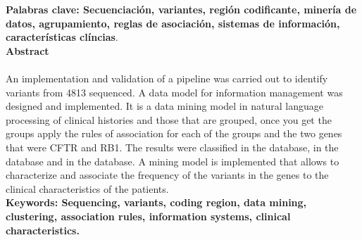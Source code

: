 \textbf{\small Palabras clave: Secuenciación, variantes, región codificante, minería de datos, agrupamiento, reglas de asociación, sistemas de información, características clíncias}.\\


\textbf{\LARGE Abstract}\\\\
An implementation and validation of a pipeline was carried out to identify variants from 4813 sequenced. A data model for information management was designed and implemented. It is a data mining model in natural language processing of clinical histories and those that are grouped, once you get the groups apply the rules of association for each of the groups and the two genes that were  CFTR and RB1. The results were classified in the database, in the database and in the database. A mining model is implemented that allows to characterize and associate the frequency of the variants in the genes to the clinical characteristics of the patients.\\[2.0cm]
\textbf{\small Keywords: Sequencing, variants, coding region, data mining, clustering, association rules, information systems, clinical characteristics.}\\